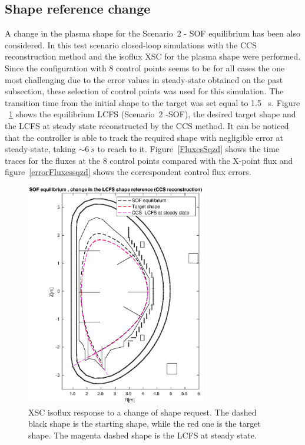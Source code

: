 \subsection{Shape reference change}

A change in the plasma shape for the Scenario~2 - SOF equilibrium has been also considered. In this test scenario closed-loop simulations  with the  CCS reconstruction method and the isoflux XSC for the plasma shape were performed.   Since the configuration with 8 control points seems to be for all cases the one most challenging due to the error values in steady-state obtained on the past subsection, these selection of control points was used for this simulation. The transition time from the initial shape to the target was set equal to 1.5 ~s.  Figure ~\ref{sqzd} shows the equilibrium LCFS (Scenario~2 -SOF), the desired target shape and the LCFS at steady state reconstructed by the CCS method. It can be noticed that the controller is able to track the required shape with negligible error at steady-state, taking $\sim 6~ s$ to reach to it. Figure~\ref{FluxesSqzd} shows the time traces for the fluxes at the 8 control points compared with the X-point flux and figure~\ref{errorFluxessqzd} shows the correspondent control flux errors.



\begin{figure}
	\begin{center}
		\includegraphics[width=0.7\textwidth]{Chp3/8gaps_LCFScompar_sqzd.eps}
	\end{center}	
\caption{XSC isoflux response to a change of shape request. The dashed black shape is the starting shape, while the red one is the target shape. The magenta dashed shape is the LCFS at steady state.  }
	\label{sqzd}
\end{figure}




